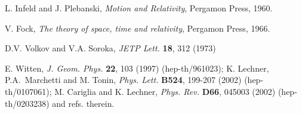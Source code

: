 \documentclass[a4paper,11pt]{article}
\begin{document}
{\begin{thebibliography}{99}
L. Infeld and J. Plebanski, {\it Motion and Relativity}, 
Pergamon Press, 1960.

V. Fock, {\it The theory of space, time and relativity}, Pergamon Press, 
1966.

D.V. Volkov and V.A. Soroka, {\em JETP Lett.} {\bf 18}, 312 (1973)

E. Witten, 
{\em J. Geom. Phys.} {\bf  22}, 103 (1997) (hep-th/961023);  
K. Lechner, P.A.~Marchetti and M. Tonin, 
{\em Phys. Lett.} {\bf B524}, 199-207 (2002) (hep-th/0107061);  
M. Cariglia and K. Lechner, 
{\em Phys. Rev.} {\bf D66}, 045003 (2002) 
(hep-th/0203238) and refs. therein. 

\end{thebibliography}
}
\end{document}

